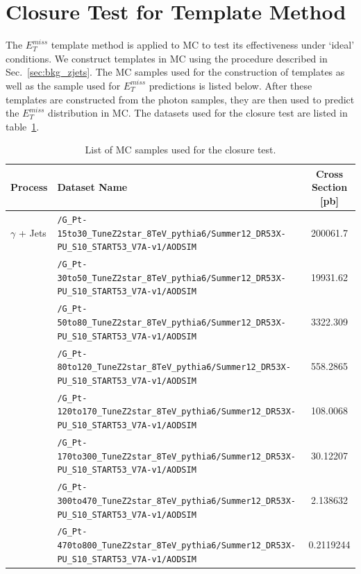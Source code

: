 \clearpage
\section{Closure Test for Template Method}
\label{sec:templateclosure}

The $E^{miss}_T$ template method is applied to MC to test its effectiveness under ‘ideal’ conditions. We construct
templates in MC using the procedure described in Sec.~\ref{sec:bkg_zjets}. The MC samples used for the construction of templates as well
as the sample used for $E^{miss}_T$  predictions is listed below. After these templates are constructed from the photon samples, 
they are then used to predict the $E^{miss}_T$ distribution in \zjets MC. The datasets used for the closure test are listed in table~\ref{tab:closuremc}.

\begin{table}[htb]                                                                                                                                                              
\begin{center}                                                                                                                                                
\scriptsize
\caption{\label{tab:closuremc} List of MC samples used for the closure test.}
\begin{tabular}{l|l|c}  
\hline
\hline
Process & Dataset Name & Cross Section [pb] \\
\hline
$\gamma$ + Jets & \verb=/G_Pt-15to30_TuneZ2star_8TeV_pythia6/Summer12_DR53X-PU_S10_START53_V7A-v1/AODSIM= & 200061.7 \\
 & \verb=/G_Pt-30to50_TuneZ2star_8TeV_pythia6/Summer12_DR53X-PU_S10_START53_V7A-v1/AODSIM= & 19931.62 \\
 & \verb=/G_Pt-50to80_TuneZ2star_8TeV_pythia6/Summer12_DR53X-PU_S10_START53_V7A-v1/AODSIM= & 3322.309 \\
 & \verb=/G_Pt-80to120_TuneZ2star_8TeV_pythia6/Summer12_DR53X-PU_S10_START53_V7A-v1/AODSIM= & 558.2865 \\
 & \verb=/G_Pt-120to170_TuneZ2star_8TeV_pythia6/Summer12_DR53X-PU_S10_START53_V7A-v1/AODSIM= & 108.0068 \\
 & \verb=/G_Pt-170to300_TuneZ2star_8TeV_pythia6/Summer12_DR53X-PU_S10_START53_V7A-v1/AODSIM= & 30.12207 \\
 & \verb=/G_Pt-300to470_TuneZ2star_8TeV_pythia6/Summer12_DR53X-PU_S10_START53_V7A-v1/AODSIM= & 2.138632 \\
 & \verb=/G_Pt-470to800_TuneZ2star_8TeV_pythia6/Summer12_DR53X-PU_S10_START53_V7A-v1/AODSIM= & 0.2119244 \\

\end{tabular}
\end{center}
\end{table}
